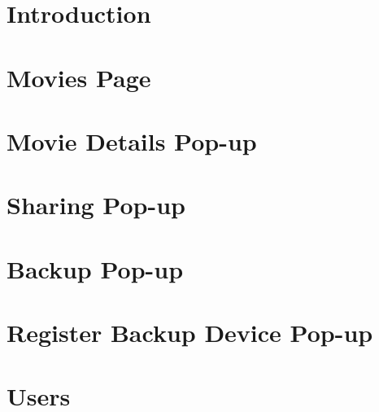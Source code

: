 \documentclass{report}
\begin{document}
\maketitle
\tableofcontents

\chapter{Introduction}


\chapter{Movies Page}


%

\chapter{Movie Details Pop-up}


\chapter{Sharing Pop-up}


\chapter{Backup Pop-up}


\chapter{Register Backup Device Pop-up\label{chapter:registerbackupdevice}}


\chapter{Users}


\appendix

\end{document}
